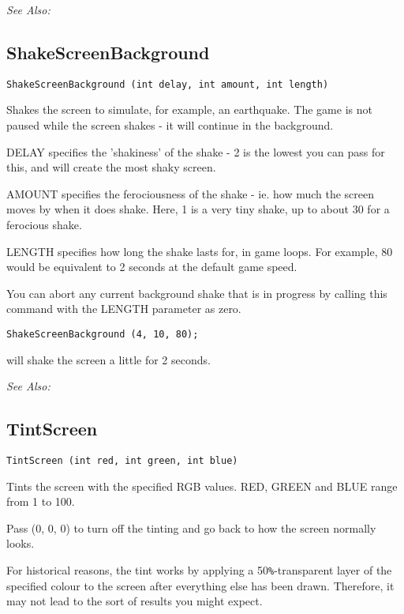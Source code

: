 \it{See Also:} 


\subsection{ShakeScreenBackground}\label{ShakeScreenBackground}%

\begin{verbatim}
ShakeScreenBackground (int delay, int amount, int length)
\end{verbatim}
Shakes the screen to simulate, for example, an earthquake. The game is not paused
while the screen shakes - it will continue in the background.

DELAY specifies the 'shakiness' of the shake - 2 is the lowest you can pass for this,
and will create the most shaky screen.

AMOUNT specifies the ferociousness of the shake - ie. how much the screen moves by when it
does shake. Here, 1 is a very tiny shake, up to about 30 for a ferocious shake.

LENGTH specifies how long the shake lasts for, in game loops. For example, 80 would be
equivalent to 2 seconds at the default game speed.

You can abort any current background shake that is in progress by calling this command
with the LENGTH parameter as zero.

\begin{verbatim}
ShakeScreenBackground (4, 10, 80);
\end{verbatim}
will shake the screen a little for 2 seconds.

\it{See Also:} 


\subsection{TintScreen}\label{TintScreen}%

\begin{verbatim}
TintScreen (int red, int green, int blue)
\end{verbatim}
Tints the screen with the specified RGB values. RED, GREEN and BLUE range
from 1 to 100.

Pass (0, 0, 0) to turn off the tinting and go back to how the screen
normally looks.

For historical reasons, the tint works by applying a 50\verb$%$-transparent layer
of the specified colour to the screen after everything else has been drawn.
Therefore, it may not lead to the sort of results you might expect.


